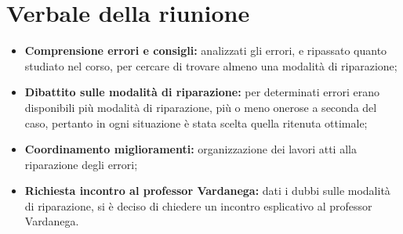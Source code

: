 \section{Verbale della riunione}
	\begin{itemize}
		\item \textbf{Comprensione errori e consigli:} analizzati gli errori, e ripassato quanto studiato nel corso, per cercare di trovare almeno una modalità di riparazione;
		\item \textbf{Dibattito sulle modalità di riparazione:} per determinati errori erano disponibili più modalità di riparazione, più o meno onerose a seconda del caso, pertanto in ogni situazione è stata scelta quella ritenuta ottimale;
		\item \textbf{Coordinamento miglioramenti:} organizzazione dei lavori atti alla riparazione degli errori;
		\item \textbf{Richiesta incontro al professor Vardanega:} dati i dubbi sulle modalità di riparazione, si è deciso di chiedere un incontro esplicativo al professor Vardanega.
	\end{itemize}